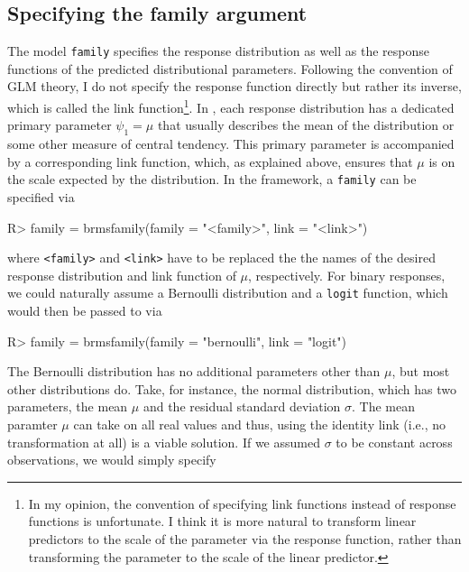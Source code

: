\documentclass[jss]{jss}
\begin{document}
\hypertarget{family-prior}{%
\subsection{Specifying the family argument}\label{family-prior}}

The model \texttt{family} specifies the response distribution as well as
the response functions of the predicted distributional parameters.
Following the convention of GLM theory, I do not specify the response
function directly but rather its inverse, which is called the link
function\footnote{In my opinion, the
convention of specifying link functions instead of response functions is
unfortunate. I think it is more natural to transform linear predictors to the
scale of the parameter via the response function, rather than transforming the
parameter to the scale of the linear predictor.}. In , each
response distribution has a dedicated primary parameter \(\psi_1 = \mu\)
that usually describes the mean of the distribution or some other
measure of central tendency. This primary parameter is accompanied by a
corresponding link function, which, as explained above, ensures that
\(\mu\) is on the scale expected by the distribution. In the 
framework, a \texttt{family} can be specified via

\begin{CodeChunk}

\begin{CodeInput}
R> family = brmsfamily(family = "<family>", link = "<link>")
\end{CodeInput}
\end{CodeChunk}

where \texttt{\textless{}family\textgreater{}} and
\texttt{\textless{}link\textgreater{}} have to be replaced the the names
of the desired response distribution and link function of \(\mu\),
respectively. For binary responses, we could naturally assume a
Bernoulli distribution and a \texttt{logit} function, which would then
be passed to  via

\begin{CodeChunk}

\begin{CodeInput}
R> family = brmsfamily(family = "bernoulli", link = "logit")
\end{CodeInput}
\end{CodeChunk}

The Bernoulli distribution has no additional parameters other than
\(\mu\), but most other distributions do. Take, for instance, the normal
distribution, which has two parameters, the mean \(\mu\) and the
residual standard deviation \(\sigma\). The mean paramter \(\mu\) can
take on all real values and thus, using the identity link (i.e., no
transformation at all) is a viable solution. If we assumed \(\sigma\) to
be constant across observations, we would simply specify
\end{document}
